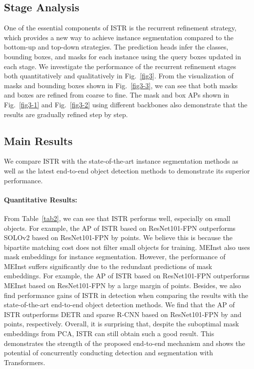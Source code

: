 \documentclass[10pt,twocolumn,letterpaper]{article}
\begin{document}
\subsection{Stage Analysis}
One of the essential components of ISTR is the recurrent refinement strategy, which provides a new way to achieve instance segmentation compared to the bottom-up and top-down strategies.
The prediction heads infer the classes, bounding boxes, and masks for each instance using the query boxes updated in each stage.
We investigate the performance of the recurrent refinement stages both quantitatively and qualitatively in Fig.~\ref{fig3}.
From the visualization of masks and bounding boxes shown in Fig.~\ref{fig3-3}, we can see that both masks and boxes are refined from coarse to fine.
The mask and box APs shown in Fig.~\ref{fig3-1} and Fig.~\ref{fig3-2} using different backbones also demonstrate that the results are gradually refined step by step.
\subsection{Main Results}
We compare ISTR with the state-of-the-art instance segmentation methods as well as the latest end-to-end object detection methods to demonstrate its superior performance.
\paragraph{Quantitative Results:} From Table~\ref{tab2}, we can see that ISTR performs well, especially on small objects.
For example, the AP of ISTR based on ResNet101-FPN outperforms SOLOv2 based on ResNet101-FPN by  points.
We believe this is because the bipartite matching cost does not filter small objects for training.
MEInst also uses mask embeddings for instance segmentation.
However, the performance of MEInst suffers significantly due to the redundant predictions of mask embeddings.
For example, the AP of ISTR based on ResNet101-FPN outperforms MEInst based on ResNet101-FPN by a large margin of  points.
Besides, we also find performance gains of ISTR in detection when comparing the results with the state-of-the-art end-to-end object detection methods.
We find that the AP of ISTR outperforms DETR and sparse R-CNN based on ResNet101-FPN by  and  points, respectively.
Overall, it is surprising that, despite the suboptimal mask embeddings from PCA, ISTR can still obtain such a good result.
This demonstrates the strength of the proposed end-to-end mechanism and shows the potential of concurrently conducting detection and segmentation with Transformers.
\end{document}
